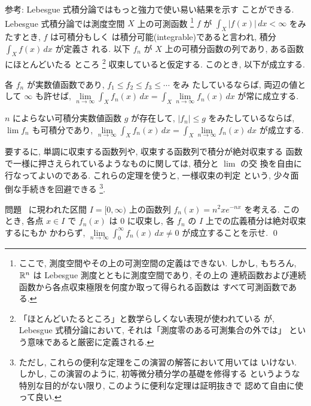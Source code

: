 \documentclass[12pt,twoside]{jarticle}
\begin{document}
\begin{small}

  \noindent 参考: Lebesgue 式積分論ではもっと強力で使い易い結果を示す
  ことができる. Lebesgue 式積分論では測度空間 $X$ 上の可測函数%
  \footnote{ここで, 測度空間やその上の可測空間の定義はできない. しかし,
    もちろん, ${\mathbb R}^n$ は Lebesgue 測度とともに測度空間であり, その上の
    連続函数および連続函数から各点収束極限を何度か取って得られる函数は
    すべて可測函数である.}%
  $f$ が $\int_X|f(x)|\,dx < \infty$ をみたすとき, $f$ は可積分もしく
  は積分可能(integrable)であると言われ, 積分 $\int_X f(x)\,dx$ が定義さ
  れる. %
  以下 $f_n$ が $X$ 上の可積分函数の列であり, ある函数にほとんどいたる
  ところ%
  \footnote{「ほとんどいたるところ」と数学らしくない表現が使われている
    が, Lebesgue 式積分論において, それは「測度零のある可測集合の外では」
    という意味であると厳密に定義される.}%
  収束していると仮定する. このとき, 以下が成立する.
  \begin{Theorem}[単調収束定理]
    各 $f_n$ が実数値函数であり, $f_1 \le f_2 \le f_3 \le \cdots$ をみ
    たしているならば, 両辺の値として $\infty$ も許せば, 
    \(%
      \lim\limits_{n\to\infty} \int_X f_n(x) \,dx
      =
      \int_X \lim\limits_{n\to\infty} f_n(x) \,dx
    \)%
    が常に成立する.
  \end{Theorem}
  \begin{Theorem}[Lebesgueの収束定理]
    $n$ によらない可積分実数値函数 $g$ が存在して, $|f_n| \le g$
    をみたしているならば, $\lim f_n$ も可積分であり,
    \(%
      \lim\limits_{n\to\infty} \int_X f_n(x) \,dx
      =
      \int_X \lim\limits_{n\to\infty} f_n(x) \,dx
    \)%
    が成立する.
  \end{Theorem}
  要するに, 単調に収束する函数列や, 収束する函数列で積分が絶対収束する
  函数で一様に押さえられているようなものに関しては, 積分と $\lim$ の交
  換を自由に行なってよいのである. これらの定理を使うと, 一様収束の判定
  という, 少々面倒な手続きを回避できる%
  \footnote{ただし, これらの便利な定理をこの演習の解答において用いては
    いけない. しかし, この演習のように, 初等微分積分学の基礎を修得する
    というような特別な目的がない限り, このように便利な定理は証明抜きで
    認めて自由に使って良い. }.

\end{small}

\begin{question}
  問題 \ に現われた区間 $I=[0,\infty)$ 上の函数列 %
  $f_n(x) = n^2 x e^{-nx}$ を考える. このとき, 各点 $x\in I$ で $f_n(x)$ %
  は $0$ に収束し, 各 $f_n$ の $I$ 上での広義積分は絶対収束するにもか
  かわらず,
  \(%
    \lim\limits_{n\to\infty} \int_0^\infty f_n(x) \,dx
    \ne
    0
  \)%
  が成立することを示せ. \qed
\end{question}
\end{document}
